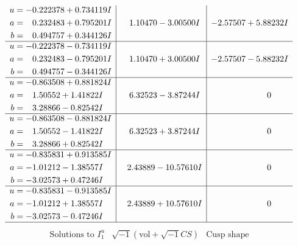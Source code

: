 \documentclass[1p]{elsarticle_modified}
\theoremstyle{definition}
\newcommand{\I}{\sqrt{-1}}
\begin{document}
$$\begin{array}{c|c|c}
\begin{aligned}
u &= -0.222378 + 0.734119 I \\
a &= \phantom{-}0.232483 + 0.795201 I \\
b &= \phantom{-}0.494757 + 0.344126 I\end{aligned}
 & \phantom{-}1.10470 - 3.00500 I & -2.57507 + 5.88232 I \\ \hline\begin{aligned}
u &= -0.222378 - 0.734119 I \\
a &= \phantom{-}0.232483 - 0.795201 I \\
b &= \phantom{-}0.494757 - 0.344126 I\end{aligned}
 & \phantom{-}1.10470 + 3.00500 I & -2.57507 - 5.88232 I \\ \hline\begin{aligned}
u &= -0.863508 + 0.881824 I \\
a &= \phantom{-}1.50552 + 1.41822 I \\
b &= \phantom{-}3.28866 - 0.82542 I\end{aligned}
 & \phantom{-}6.32523 - 3.87244 I & \phantom{-0.000000 } 0 \\ \hline\begin{aligned}
u &= -0.863508 - 0.881824 I \\
a &= \phantom{-}1.50552 - 1.41822 I \\
b &= \phantom{-}3.28866 + 0.82542 I\end{aligned}
 & \phantom{-}6.32523 + 3.87244 I & \phantom{-0.000000 } 0 \\ \hline\begin{aligned}
u &= -0.835831 + 0.913585 I \\
a &= -1.01212 - 1.38557 I \\
b &= -3.02573 + 0.47246 I\end{aligned}
 & \phantom{-}2.43889 - 10.57610 I & \phantom{-0.000000 } 0 \\ \hline\begin{aligned}
u &= -0.835831 - 0.913585 I \\
a &= -1.01212 + 1.38557 I \\
b &= -3.02573 - 0.47246 I\end{aligned}
 & \phantom{-}2.43889 + 10.57610 I & \phantom{-0.000000 } 0\\
 \hline 
 \end{array}$$\newpage$$\begin{array}{c|c|c}  
\text{Solutions to }I^u_{1}& \I (\text{vol} + \sqrt{-1}CS) & \text{Cusp shape}\\
 \hline 
\begin{aligned}

\end{aligned}
\end{array}$$
\end{document}
